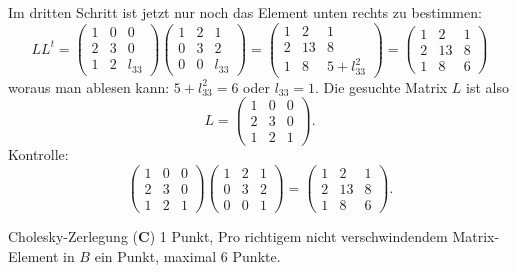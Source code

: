 \begin{loesung}
Im dritten Schritt ist jetzt nur noch das Element unten rechts zu bestimmen:
\[
LL^t=
\begin{pmatrix}
1&0&     0\\
2&3&     0\\
1&2&l_{33}
\end{pmatrix}
\begin{pmatrix}
1&2&     1\\
0&3&     2\\
0&0&l_{33}
\end{pmatrix}
=
\begin{pmatrix}
1& 2&1\\
2&13&8\\
1& 8&5+l_{33}^2
\end{pmatrix}
=
\begin{pmatrix}
1& 2&1\\
2&13&8\\
1& 8&6
\end{pmatrix}
\]
woraus man ablesen kann: $5+l_{33}^2=6$ oder $l_{33}=1$. Die gesuchte
Matrix $L$ ist also
\[
L=
\begin{pmatrix}
1&0&0\\
2&3&0\\
1&2&1
\end{pmatrix}.
\]
Kontrolle:
\[
\begin{pmatrix}
1&0&0\\
2&3&0\\
1&2&1
\end{pmatrix}
\begin{pmatrix}
1&2&1\\
0&3&2\\
0&0&1
\end{pmatrix}
=
\begin{pmatrix}
1& 2&1\\
2&13&8\\
1& 8&6
\end{pmatrix}.
\]
\end{loesung}

\begin{bewertung}
Cholesky-Zerlegung ({\bf C}) 1 Punkt,
Pro richtigem nicht verschwindendem Matrix-Element in $B$ ein Punkt,
maximal 6 Punkte.
\end{bewertung}
